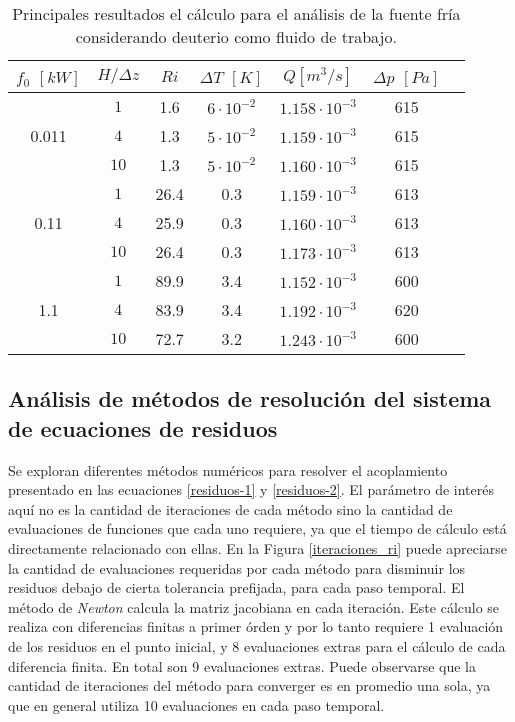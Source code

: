 \begin{table}[h!]
  \centering
  \begin{tabular}{ c c c c c c c } 
      \hline
      \multicolumn{1}{c}{$f_0$ $[kW]$} & \multicolumn{1}{c}{$H / \Delta z$} & \multicolumn{1}{c}{$Ri$} & \multicolumn{1}{c}{$\Delta T$ $[K]$} & \multicolumn{1}{c}{$Q$$[m^3/s]$}& \multicolumn{1}{c}{$\Delta p$ $[Pa]$} \\ \hline
      \multirow{3}{*}{0.011} & $1$ & 1.6 & $6\cdot10^{-2}$ & $1.158 \cdot 10^{-3}$ & 615 \\
                         & $4$ & 1.3 & $5\cdot10^{-2}$ & $1.159 \cdot 10^{-3}$ & 615 \\
                         & $10$ & 1.3 & $5\cdot10^{-2}$ & $1.160 \cdot 10^{-3}$ & 615 \\ \hline
      \multirow{3}{*}{0.11} & $1$ & 26.4 & 0.3 & $1.159 \cdot 10^{-3}$ & 613 \\
                         & $4$ & 25.9 & 0.3 & $1.160 \cdot 10^{-3}$ & 613 \\
                         & $10$ & 26.4 & 0.3 & $1.173 \cdot 10^{-3}$ & 613 \\ \hline
      \multirow{3}{*}{1.1} & $1$ & 89.9 & 3.4 & $1.152 \cdot 10^{-3}$ & 600 \\
                         & $4$ & 83.9 & 3.4 & $1.192 \cdot 10^{-3}$ & 620 \\
                         & $10$ & 72.7 & 3.2 & $1.243 \cdot 10^{-3}$ & 600 \\ \hline
   \end{tabular}   
   \caption[Principales resultados el cálculo para el análisis del sistema fluídico cerrado considerando agua como fluido de trabajo]
   {Principales resultados el cálculo para el análisis de la fuente fría considerando deuterio como fluido de trabajo.}
   \label{tab-deuterio}
\end{table}

\subsection*{Análisis de métodos de resolución del sistema de ecuaciones de residuos}

Se exploran diferentes métodos numéricos para resolver el acoplamiento presentado en las ecuaciones \ref{residuos-1} y \ref{residuos-2}.
El parámetro de interés aquí no es la cantidad de iteraciones de cada método sino la cantidad de evaluaciones de funciones que cada uno requiere,
ya que el tiempo de cálculo está directamente relacionado con ellas.
En la Figura \ref{iteraciones_ri} puede apreciarse la cantidad de evaluaciones requeridas 
por cada método para disminuir los residuos debajo de cierta tolerancia prefijada, para cada paso temporal.
El método de \textit{Newton} calcula la matriz jacobiana en cada iteración.
Este cálculo se realiza con diferencias finitas a primer órden y por lo tanto requiere 1 evaluación de los residuos en el punto inicial,
y 8 evaluaciones extras para el cálculo de cada diferencia finita.
En total son 9 evaluaciones extras.
Puede observarse que la cantidad de iteraciones del método para converger es en promedio una sola, ya que en general utiliza 10 evaluaciones en cada paso temporal.

